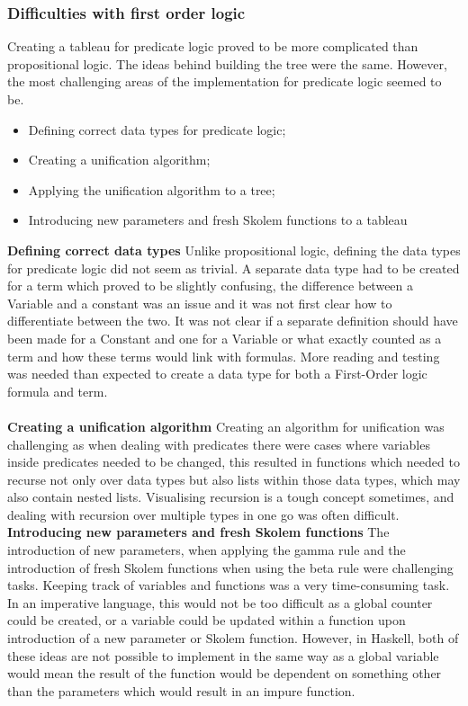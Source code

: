 \documentclass{article}%
\begin{document}
\subsubsection{Difficulties with first order logic}
Creating a tableau for predicate logic proved to be more complicated than propositional logic. The ideas behind building the tree were the same. However, the most challenging areas of the implementation for predicate logic seemed to be. 
\begin{itemize}
\item Defining correct data types for predicate logic;
\item Creating a unification algorithm;
\item Applying the unification algorithm to a tree;
\item Introducing new parameters and fresh Skolem functions to a tableau 
\end{itemize}
\textbf{Defining correct data types} 
Unlike propositional logic, defining the data types for predicate logic did not seem as trivial. A separate data type had to be created for a term which proved to be slightly confusing, the difference between a Variable and a constant was an issue and it was not first clear how to differentiate between the two. It was not clear if a separate definition should have been made for a Constant and one for a Variable or what exactly counted as a term and how these terms would link with formulas. More reading and testing was needed than expected to create a data type for both a First-Order logic formula and term. \\\\
\textbf{Creating a unification algorithm} Creating an algorithm for unification was challenging as when dealing with predicates there were cases where variables inside predicates needed to be changed, this resulted in functions which needed to recurse not only over data types but also lists within those data types, which may also contain nested lists. Visualising recursion is a tough concept sometimes, and dealing with recursion over multiple types in one go was often difficult.
\textbf{Introducing new parameters and fresh Skolem functions}
The introduction of new parameters, when applying the gamma rule and the introduction of fresh Skolem functions when using the beta rule were challenging tasks. Keeping track of variables and functions was a very time-consuming task. In an imperative language, this would not be too difficult as a global counter could be created, or a variable could be updated within a function upon introduction of a new parameter or Skolem function. However, in Haskell, both of these ideas are not possible to implement in the same way as a global variable would mean the result of the function would be dependent on something other than the parameters which would result in an impure function.\\ 
\end{document}
